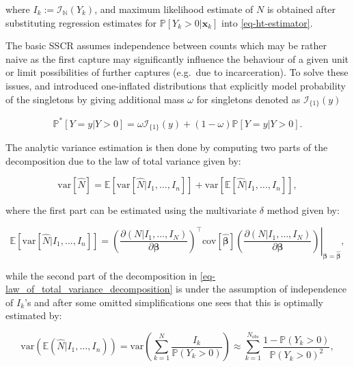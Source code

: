 \documentclass[
]{jss}
\newcommand{\1}{\mathcal{I}} \newcommand{\bZero}{\boldsymbol{0}}
\begin{document}
where \(I_{k}:=\mathcal{I}_{\mathbb{N}}(Y_{k})\), and maximum likelihood
estimate of \(N\) is obtained after substituting regression estimates
for \(\mathbb{P}[Y_{k}>0|\boldsymbol{x}_{k}]\) into
\eqref{eq-ht-estimator}.

The basic SSCR assumes independence between counts which may be rather
naive as the first capture may significantly influence the behaviour of
a given unit or limit possibilities of further captures (e.g.~due to
incarceration). To solve these issues, \citet{godwin2017estimation} and
\citet{ztoi-oizt-poisson} introduced one-inflated distributions that
explicitly model probability of the singletons by giving additional mass
\(\omega\) for singletons denoted as \(\mathcal{I}_{\{1\}}(y)\)
\citep[cf.][]{bohning2024one}

\begin{equation*}
  \mathbb{P}^{\ast}[Y=y|Y>0] =
  \omega\mathcal{I}_{\{1\}}(y)+(1-\omega)\mathbb{P}[Y=y|Y>0].
\end{equation*}

The analytic variance estimation is then done by computing two parts of
the decomposition due to the law of total variance given by:

\begin{equation}\label{eq-law_of_total_variance_decomposition}
  \text{var}[\hat{N}] = \mathbb{E}\left[\text{var}
  \left[\hat{N}|I_{1},\dots,I_{n}\right]\right] + 
  \text{var}\left[\mathbb{E}[\hat{N}|I_{1},\dots,I_{n}]\right],
\end{equation}

where the first part can be estimated using the multivariate \(\delta\)
method given by:

\begin{equation*}
  \mathbb{E}\left[\text{var} \left[\hat{N}|I_{1},\dots,I_{n}\right]\right] =
  \left.\left(\frac{\partial(N|I_1,\dots,I_N)}{\partial\boldsymbol{\beta}}\right)^\top
  \text{cov}\left[\hat{\boldsymbol{\beta}}\right]
  \left(\frac{\partial(N|I_1,\dots,I_N)}{\partial\boldsymbol{\beta}}\right)
  \right|_{\boldsymbol{\beta}=\hat{\boldsymbol{\beta}}},
\end{equation*}

while the second part of the decomposition in
\eqref{eq-law_of_total_variance_decomposition} is under the assumption
of independence of \(I_{k}\)'s and after some omitted simplifications
one sees that this is optimally estimated by:

\begin{equation*}
  \text{var}\left(\mathbb{E}(\hat{N}|I_{1},\dots,I_{n})\right) =
  \text{var}\left(\sum_{k=1}^{N}\frac{I_{k}}{\mathbb{P}(Y_{k}>0)}\right)
  \approx\sum_{k=1}^{N_{obs}}\frac{1-\mathbb{P}(Y_{k}>0)}{\mathbb{P}(Y_{k}>0)^{2}},
\end{equation*}
\end{document}
